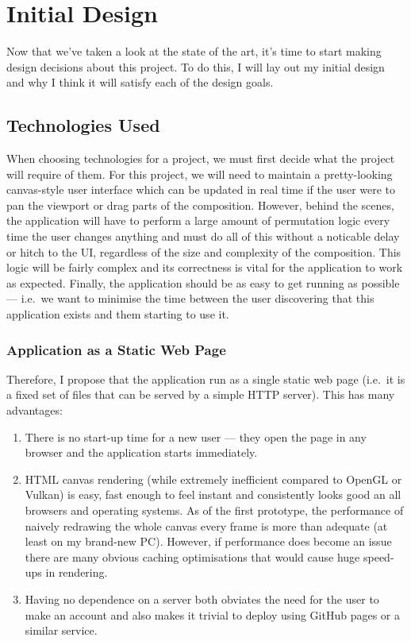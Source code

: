 \documentclass[12pt]{article}
\begin{document}
\section{Initial Design}

Now that we've taken a look at the state of the art, it's time to start making design decisions
about this project.  To do this, I will lay out my initial design and why I think it will satisfy
each of the design goals.

\subsection{Technologies Used}

When choosing technologies for a project, we must first decide what the project will require of
them.  For this project, we will need to maintain a pretty-looking canvas-style user interface which
can be updated in real time if the user were to pan the viewport or drag parts of the composition.
However, behind the scenes, the application will have to perform a large amount of permutation logic
every time the user changes anything and must do all of this without a noticable delay or hitch to
the UI, regardless of the size and complexity of the composition.  This logic will be fairly complex
and its correctness is vital for the application to work as expected.  Finally, the application
should be as easy to get running as possible --- i.e.\ we want to minimise the time between the user
discovering that this application exists and them starting to use it.

\subsubsection{Application as a Static Web Page}

Therefore, I propose that the application run as a single static web page (i.e.\ it is a fixed set
of files that can be served by a simple HTTP server).  This has many advantages:
\begin{enumerate}
    \item There is no start-up time for a new user --- they open the page in any browser and the
        application starts immediately.
    \item HTML canvas rendering (while extremely inefficient compared to OpenGL or Vulkan) is easy,
        fast enough to feel instant and consistently looks good an all browsers and operating
        systems.  As of the first prototype, the performance of naively redrawing the whole canvas
        every frame is more than adequate (at least on my brand-new PC).  However, if performance
        does become an issue there are many obvious caching optimisations that would cause huge
        speed-ups in rendering.
    \item Having no dependence on a server both obviates the need for the user to make an account
        and also makes it trivial to deploy using GitHub pages or a similar service.
\end{enumerate}
\end{document}
